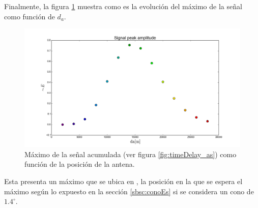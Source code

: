 	Finalmente, la figura \ref{fig:timeDelay_spa} muestra como es la evolución del máximo de la señal como función de $d_a$.	
	\begin{figure}[ht!]
		\centering
		\includegraphics[width=\textwidth]{./fig/EASRadio/timeDelay_spa}
		\caption{\label{fig:timeDelay_spa}
		M\'aximo de la se\~nal acumulada (ver figura \ref{fig:timeDelay_as}) como función de la posici\'on de la antena.
		}
	\end{figure}
	Esta presenta un máximo que se ubica en , la posición en la que se espera el máximo según lo expuesto en la sección \ref{sbsc:conoEs} si se considera un cono \cher{} de $1.4^\circ$.
	